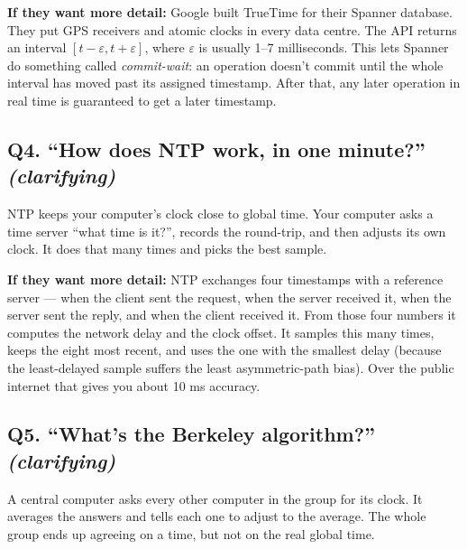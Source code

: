 \documentclass[a4paper,11pt]{article}
\begin{document}
\begin{deepans}
\textbf{If they want more detail:} Google built TrueTime for their
Spanner database. They put GPS receivers and atomic clocks in
every data centre. The API returns an interval
$[t - \varepsilon, t + \varepsilon]$, where $\varepsilon$ is
usually 1--7 milliseconds. This lets Spanner do something called
\emph{commit-wait}: an operation doesn't commit until the whole
interval has moved past its assigned timestamp. After that, any
later operation in real time is guaranteed to get a later
timestamp.
\end{deepans}

\subsection{Q4. ``How does NTP work, in one minute?'' \textnormal{\small\itshape (clarifying)}}

\begin{shortans}
NTP keeps your computer's clock close to global time. Your
computer asks a time server ``what time is it?'', records the
round-trip, and then adjusts its own clock. It does that many
times and picks the best sample.
\end{shortans}

\begin{deepans}
\textbf{If they want more detail:} NTP exchanges four timestamps
with a reference server --- when the client sent the request, when
the server received it, when the server sent the reply, and when
the client received it. From those four numbers it computes the
network delay and the clock offset. It samples this many times,
keeps the eight most recent, and uses the one with the smallest
delay (because the least-delayed sample suffers the least
asymmetric-path bias). Over the public internet that gives you
about 10 ms accuracy.
\end{deepans}

\subsection{Q5. ``What's the Berkeley algorithm?'' \textnormal{\small\itshape (clarifying)}}

\begin{shortans}
A central computer asks every other computer in the group for its
clock. It averages the answers and tells each one to adjust to the
average. The whole group ends up agreeing on a time, but not on
the real global time.
\end{shortans}
\end{document}
